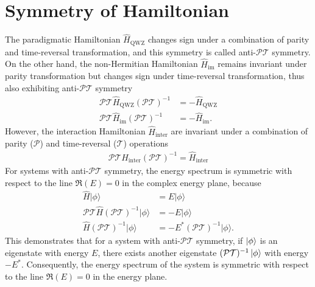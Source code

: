 \documentclass[longbibliography, aps, prx, amsmath, amssymb, amsfonts, twocolumn,superscriptaddress, footinbib]{revtex4-1}
\begin{document}
	\section{Symmetry of Hamiltonian~\label{sec:symmetry_Hamiltonian}}
	The paradigmatic Hamiltonian $\hat{H}_{\text{QWZ}}$ changes sign under a combination of parity and time-reversal transformation, and this symmetry is called anti-$\mathcal{PT}$ symmetry.
	On the other hand, the non-Hermitian Hamiltonian $\hat{H}_{\text{im}}$ remains invariant under parity transformation but changes sign under time-reversal transformation, thus also exhibiting anti-$\mathcal{PT}$ symmetry
	\begin{equation}
		\begin{split}
			\mathcal{PT} \hat{H}_{\text{QWZ}} (\mathcal{PT})^{-1} &= -\hat{H}_{\text{QWZ}} \\
			\mathcal{PT} \hat{H}_{\text{im}} (\mathcal{PT})^{-1} &= -\hat{H}_{\text{im}}.
		\end{split}
	\end{equation}
	However, the interaction Hamiltonian $\hat{H}_{\text{inter}}$ are invariant under a combination of parity ($\mathcal{P}$) and time-reversal ($\mathcal{T}$) operations
	\begin{equation}
		\begin{split}
			\mathcal{PT} \hat{H}_{\text{inter}} (\mathcal{PT})^{-1} = \hat{H}_{\text{inter}}%
		\end{split}
	\end{equation}
	For systems with anti-$\mathcal{PT}$ symmetry, the energy spectrum is symmetric with respect to the line $\Re(E)=0$ in the complex energy plane, because
	\begin{equation}
		\begin{split}
			\hat{H} \vert \phi \rangle &= E \vert \phi \rangle\\
			\mathcal{PT} \hat{H} (\mathcal{PT})^{-1} \vert \phi \rangle &= - E \vert \phi \rangle\\
			\hat{H} (\mathcal{PT})^{-1} \vert \phi \rangle &= - E^* (\mathcal{PT})^{-1} \vert \phi \rangle.
		\end{split}
	\end{equation}
	This demonstrates that for a system with anti-$\mathcal{PT}$ symmetry, if $\ket{\phi}$ is an eigenstate with energy $E$, there exists another eigenstate $(\mathcal{PT})^{-1} \ket{\phi}$ with energy $-E^*$. Consequently, the energy spectrum of the system is symmetric with respect to the line $\Re(E)=0$ in the energy plane.
\end{document}
